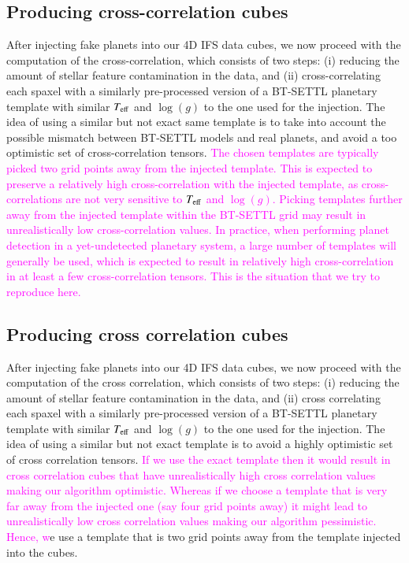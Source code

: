 \documentclass[referee]{aa} %
\newcommand{\newchange}[1]{\textcolor{magenta}{#1}}
\begin{document}
\subsection{Producing cross-correlation cubes}\label{sec:specpreproc}

After injecting fake planets into our 4D IFS data cubes, we now proceed with the computation of the cross-correlation, which consists of two steps: (i) reducing the amount of stellar feature contamination in the data, and (ii) cross-correlating each spaxel with a similarly pre-processed version of a BT-SETTL planetary template with similar $T_{\rm eff}$ and $\log(g)$ to the one used for the injection.
The idea of using a similar but not exact same template is to take into account the possible mismatch between BT-SETTL models and real planets, and avoid a too optimistic set of cross-correlation tensors. 
\newchange{The chosen templates are typically picked two grid points away from the injected template. This is expected to preserve a relatively high cross-correlation with the injected template, as cross-correlations are not very sensitive to $T_{\rm eff}$ and $\log(g)$. 
Picking templates further away from the injected template within the BT-SETTL grid may result in unrealistically low cross-correlation values. In practice, when performing planet detection in a yet-undetected planetary system, a large number of templates will generally be used, which is expected to result in relatively high cross-correlation in at least a few cross-correlation tensors. This is the situation that we try to reproduce here.}

\subsection{Producing cross correlation cubes}\label{sec:cubeproc}

After injecting fake planets into our 4D IFS data cubes, we now proceed with the computation of the cross correlation, which consists of two steps: (i) reducing the amount of stellar feature contamination in the data, and (ii) cross correlating each spaxel with a similarly pre-processed version of a BT-SETTL planetary template with similar $T_{\rm eff}$ and $\log(g)$ to the one used for the injection.
The idea of using a similar but not exact template is to avoid a highly optimistic set of cross correlation tensors.
\newchange{If we use the exact template then it would result in cross correlation cubes that have unrealistically high cross correlation values making our algorithm optimistic. 
Whereas if we choose a template that is very far away from the injected one (say four grid points away) it might lead to unrealistically low cross correlation values making our algorithm pessimistic.}
\newchange{Hence, w}e use a template that is two grid points away from the template injected into the cubes.
\end{document}
